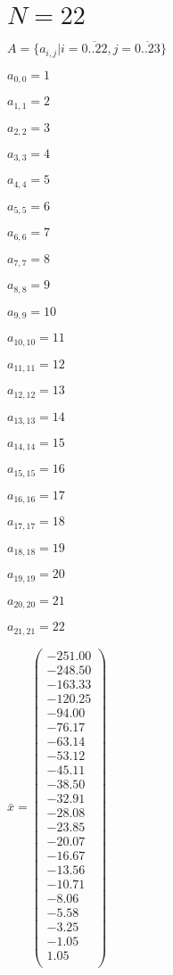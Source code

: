 \documentclass[a4paper,12pt]{article}
\begin{document}
\section{ $N = 22$ }
$A = \{ a _{ i, j } | i = \overline { 0..22 }, j = \overline { 0..23 } \}$

$a _{ 0, 0 } = 1$

$a _{ 1, 1 } = 2$

$a _{ 2, 2 } = 3$

$a _{ 3, 3 } = 4$

$a _{ 4, 4 } = 5$

$a _{ 5, 5 } = 6$

$a _{ 6, 6 } = 7$

$a _{ 7, 7 } = 8$

$a _{ 8, 8 } = 9$

$a _{ 9, 9 } = 10$

$a _{ 10, 10 } = 11$

$a _{ 11, 11 } = 12$

$a _{ 12, 12 } = 13$

$a _{ 13, 13 } = 14$

$a _{ 14, 14 } = 15$

$a _{ 15, 15 } = 16$

$a _{ 16, 16 } = 17$

$a _{ 17, 17 } = 18$

$a _{ 18, 18 } = 19$

$a _{ 19, 19 } = 20$

$a _{ 20, 20 } = 21$

$a _{ 21, 21 } = 22$

$\bar { x } = \begin{pmatrix}
-251.00 \\
-248.50 \\
-163.33 \\
-120.25 \\
-94.00 \\
-76.17 \\
-63.14 \\
-53.12 \\
-45.11 \\
-38.50 \\
-32.91 \\
-28.08 \\
-23.85 \\
-20.07 \\
-16.67 \\
-13.56 \\
-10.71 \\
-8.06 \\
-5.58 \\
-3.25 \\
-1.05 \\
1.05 \\
\end{pmatrix}
$
\end{document}
